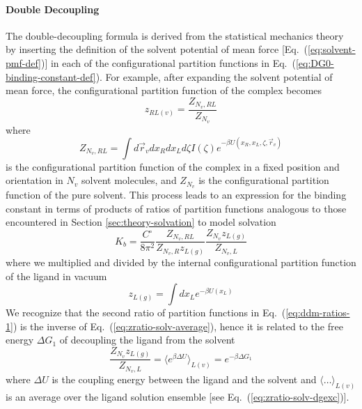 \documentclass[9pt,bestpractices]{livecoms}
\begin{document}
\paragraph{Double Decoupling}

The double-decoupling formula is derived from the statistical mechanics theory
by inserting the definition of the solvent potential of mean force [Eq.~(\ref{eq:solvent-pmf-def})] in each of the configurational partition functions in  Eq.~(\ref{eq:DG0-binding-constant-def}). For example, after expanding the solvent potential of mean force, the configurational partition function of the complex becomes
\begin{equation}\label{eq:partfunct-ratio-explsolv-1}
z_{RL(v)} = \frac{Z_{N_v, RL}}{Z_{N_v}}
\end{equation}
where
\begin{equation}\label{eq:partfunct-ratio-explsolv-2}
Z_{N_v, RL} = \int d\vec{r}_v dx_R dx_L d\zeta I(\zeta) e^{-\beta U(x_R, x_L, \zeta, \vec{r}_v)}
\end{equation}
is the configurational partition function of the complex in a fixed position and orientation in $N_v$ solvent molecules, and $Z_{N_v}$ is the configurational partition function of the pure solvent. This process leads to an expression for the binding constant in terms of products of ratios of partition functions analogous to those encountered in Section \ref{sec:theory-solvation} to model solvation
\begin{equation}
  K_b = \frac{C^\circ}{8 \pi^2} \frac{Z_{N_v,RL}}{Z_{N_v,R} z_{L(g)}} \frac{Z_{N_v} z_{L(g)}}{Z_{N_v,L}}
  \label{eq:ddm-ratios-1}
\end{equation}
where we multiplied and divided by the internal configurational partition function of the ligand in vacuum
\begin{equation}
z_{L(g)} = \int dx_L e^{-\beta U(x_L)}
\end{equation}
We recognize that the second ratio of partition functions in Eq.~(\ref{eq:ddm-ratios-1}) is the inverse of Eq.~(\ref{eq:zratio-solv-average}), hence it is related to the free energy $\Delta G_1$ of decoupling the ligand from the solvent
\begin{equation}
\frac{Z_{N_v} z_{L(g)}}{Z_{N_v,L}} = \langle e^{\beta \Delta U}  \rangle_{L(v)} = e^{-\beta \Delta G_1}
\end{equation}
where $\Delta U$ is the coupling energy between the ligand and the solvent and $\langle \ldots \rangle_{L(v)}$ is an average over the ligand solution ensemble [see Eq.~(\ref{eq:zratio-solv-dgexc})].
\end{document}
